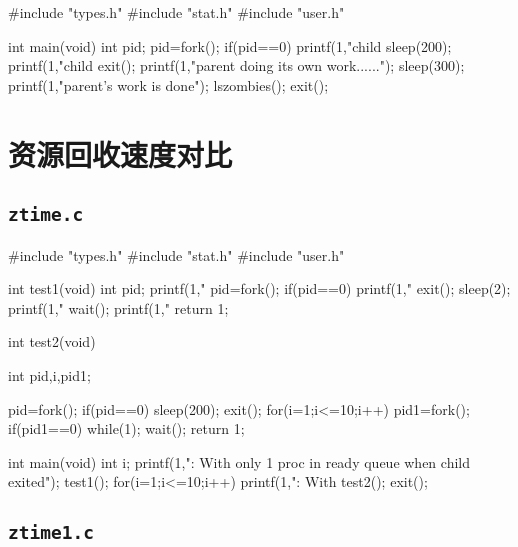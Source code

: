 \documentclass{swfuthesism}
\begin{document}
\begin{ccode}
#include "types.h"
#include "stat.h"
#include "user.h"

int main(void)
{
  int pid;
  pid=fork();
  if(pid==0)
  {
    printf(1,"child %
    sleep(200);
    printf(1,"child %
    exit();
  }
  printf(1,"parent doing its own work\n......\n");
  sleep(300);
  printf(1,"parent's work is done\n");
  lszombies();
  exit();
}
\end{ccode}

\clearpage
\section{资源回收速度对比}
\label{sec:spdcmp}

\subsection{\texttt{ztime.c}}
\label{sec:textttztime.c}

\begin{ccode}
#include "types.h"
#include "stat.h"
#include "user.h"

int test1(void)
{
    int pid;
    printf(1,"%
    pid=fork();
    if(pid==0)
        {
            printf(1,"%
            exit();
        }
    sleep(2);   
    printf(1,"%
    wait();
    printf(1,"%
    return 1;
}

int test2(void)
{
    int pid,i,pid1;
    
    pid=fork();
    if(pid==0)
        {
            sleep(200);
            exit();
        }
    for(i=1;i<=10;i++)
        {
            pid1=fork();
            if(pid1==0){
                while(1);}
        }
    wait();
    return 1;
}

int main(void)
{
    int i;
    printf(1,": With only 1 proc in ready queue when child exited\n");
    test1();
    for(i=1;i<=10;i++){
        printf(1,": With %
    test2();}
    exit();
}
\end{ccode}

\subsection{\texttt{ztime1.c}}
\label{sec:ztime1.c}
\end{document}
